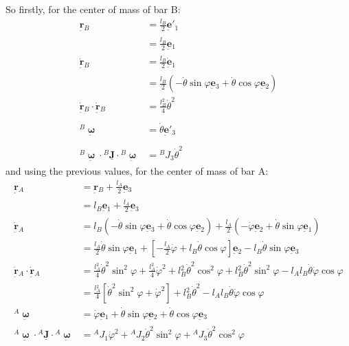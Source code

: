 \documentclass[12pt]{article}
\newcommand{\vb}[1]{{\underset{\tilde{}}{\mathbf{#1}}}}
\newcommand{\mb}[1]{\underline{\mathbf{#1}}}
\newcommand{\bomega}{\vb{\boldsymbol{\upomega}}}
\begin{document}
 So firstly, for the center of mass of bar B:
\begin{align*}
    \vb{r}{}_B &= \frac{l{}_B}{2} \vb{e}'{}_1 \\
             &= \frac{l{}_B}{2} \vb{e}{}_1 \\
    \dot{\vb{r}}{}_B &= \frac{l{}_B}{2} \dot{\vb{e}}{}_1 \\
             &= \frac{l{}_B}{2} (-\dot{\theta}\sin\varphi \vb{e}{}_3 + \dot{\theta}\cos\varphi \vb{e}{}_2) \\
    \dot{\vb{r}}{}_B \cdot \dot{\vb{r}}{}_B &= \frac{l{}_B^2}{4}\dot{\theta}^2 \\
    \\
    {}^B\bomega &= \dot{\theta} \vb{e}'{}_3 \\
    \\
    {}^B\bomega \cdot {}^B\mb{J} \cdot {}^B\bomega &= {}^B J{}_3 \dot{\theta}^2 
\end{align*}
and using the previous values, for the center of mass of bar A:
\begin{align*}
    \vb{r}{}_A &= \vb{r}{}_B + \frac{l{}_A}{2} \vb{e}{}_3 \\
             &= l{}_B \vb{e}{}_1 + \frac{l{}_A}{2} \vb{e}{}_3 \\
    \dot{\vb{r}}{}_A &= l{}_B (-\dot{\theta}\sin\varphi \vb{e}{}_3 + \dot{\theta}\cos\varphi \vb{e}{}_2) + \frac{l{}_A}{2} (-\dot{\varphi}\vb{e}{}_2 + \dot{\theta}\sin\varphi \vb{e}{}_1) \\
             &= \frac{l{}_A}{2}\dot{\theta}\sin\varphi \vb{e}{}_1 + \left[ -\frac{l{}_A}{2}\dot{\varphi} + l{}_B \dot{\theta}\cos\varphi \right] \vb{e}{}_2 - l{}_B \dot{\theta}\sin\varphi \vb{e}{}_3 \\
    \dot{\vb{r}}{}_A \cdot \dot{\vb{r}}{}_A &= \frac{l{}_A^2}{4}\dot{\theta}^2\sin^2\varphi + \frac{l{}_A^2}{4}\dot{\varphi}^2 + l{}_B^2\dot{\theta}^2\cos^2\varphi + l{}_B^2\dot{\theta}^2\sin^2\varphi - l{}_A l{}_B \dot{\theta}\dot{\varphi}\cos\varphi \\
             &= \frac{l{}_A^2}{4}[\dot{\theta}^2\sin^2\varphi + \dot{\varphi}^2] + l{}_B^2\dot{\theta}^2 - l{}_A l{}_B \dot{\theta}\dot{\varphi}\cos\varphi \\
        {}^A\bomega &= \dot{\varphi} \vb{e}{}_1 + \dot{\theta}\sin\varphi \vb{e}{}_2 + \dot{\theta}\cos\varphi \vb{e}{}_3 \\
        {}^A\bomega \cdot {}^A\mb{J} \cdot {}^A\bomega &= {}^A J{}_1 \dot{\varphi}^2 + {}^A J{}_2 \dot{\theta}^2\sin^2\varphi + {}^A J{}_3 \dot{\theta}^2\cos^2\varphi
\end{align*}
\end{document}
